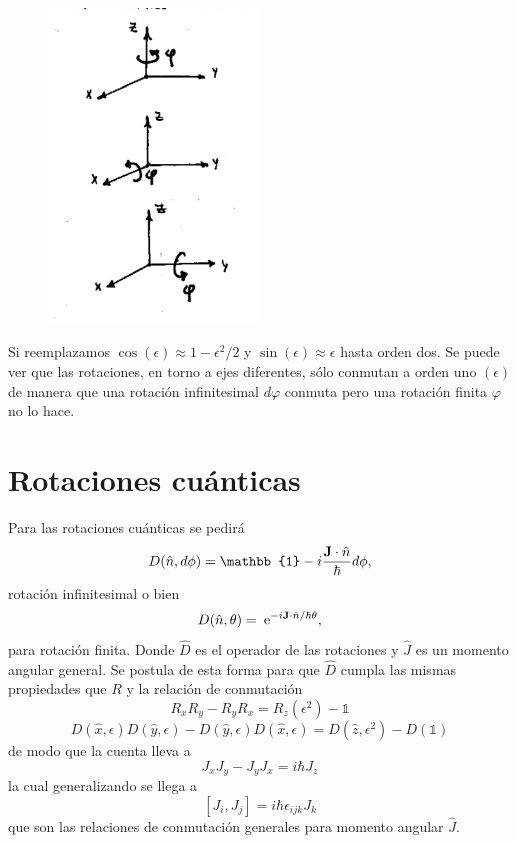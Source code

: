 \documentclass[10pt,oneside]{CBFT_book}
\begin{document}
\begin{figure}[!htb]
	\begin{center}
	\includegraphics[width=0.5\textwidth]{images/teo2_10.pdf}
	\end{center}
	\caption{}
\end{figure} 

Si reemplazamos $\cos(\epsilon) \approx 1 - \epsilon^2/2$ y $\sin(\epsilon) \approx \epsilon$ hasta orden dos.
Se puede ver que las rotaciones, en torno a ejes diferentes, sólo conmutan a orden uno $(\epsilon)$ de manera 
que una rotación infinitesimal $d\varphi$ conmuta pero una rotación finita $\varphi$ no lo hace.

\section{Rotaciones cuánticas}

Para las rotaciones cuánticas se pedirá
\[
	D(\hat{n},d\phi) = \mathbb{1} - i \frac{\vb{J}\cdot\hat{n}}{\hbar}d\phi,
\]
rotación infinitesimal o bien
\[
	D(\hat{n},\theta) = \euler^{-i \vb{J}\cdot\hat{n}/\hbar \theta},
\]
para rotación finita. Donde $\hat{D}$ es el operador de las rotaciones y $\hat{J}$ es un momento angular 
general. Se postula de esta forma para que $\hat{D}$ cumpla las mismas propiedades que $R$ y la relación de 
conmutación
\[
	R_x R_y - R_y R_x = R_z (\epsilon^2) - \mathbb{1}
\]
\[
	D(\hat{x},\epsilon) D(\hat{y},\epsilon) - D(\hat{y},\epsilon) D(\hat{x},\epsilon) =
	D(\hat{z},\epsilon^2) - D(\mathbb{1})
\]
de modo que la cuenta lleva a  
\[
	J_x J_y - J_y J_x = i \hbar J_z
\]
la cual generalizando se llega a 
\[
	[J_i,J_j] = i \hbar \epsilon_{ijk} J_k
\]
que son las relaciones de conmutación generales para momento angular $\hat{J}$.
\end{document}
